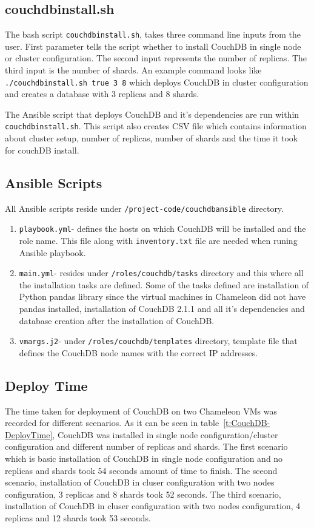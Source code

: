 \subsection{couchdbinstall.sh}

The bash script \verb|couchdbinstall.sh|, takes three command line inputs
from the user. First parameter tells the script whether to install
CouchDB in single node or cluster configuration. The second input
represents the
number of replicas. The third input is the number of shards. An
example command looks like \verb|./couchdbinstall.sh true 3 8| which
deploys CouchDB in cluster configuration and creates a database with 3
replicas and 8 shards.

The Ansible script that deploys CouchDB and it's dependencies are run
within \verb|couchdbinstall.sh|. This script also creates CSV file which
contains information about cluster setup, number of replicas, number
of shards and the time it took for couchDB install.

\subsection{Ansible Scripts}
All Ansible scripts reside under \verb|/project-code/couchdbansible|
directory. 
\begin{enumerate}
  \item \verb|playbook.yml|- defines the hosts on which CouchDB will be
    installed and the role name. This file along with \verb|inventory.txt|
    file are needed when runing Ansible playbook.

  \item \verb|main.yml|- resides under \verb|/roles/couchdb/tasks|
    directory and this where all the installation tasks are
    defined. Some of the tasks defined are installation of Python
    pandas library since the virtual machines in Chameleon did not have pandas
    installed, installation of CouchDB 2.1.1 and all it's dependencies
    and database creation after the installation of CouchDB.

  \item \verb|vmargs.j2|- under \verb|/roles/couchdb/templates| directory, template
    file that defines the CouchDB node names with the correct IP addresses.
\end{enumerate}

\subsection{Deploy Time}
The time taken for deployment of CouchDB on two Chameleon VMs was recorded for different
scenarios. As it can be seen in table~\ref{t:CouchDB-DeployTime},
CouchDB was installed in single node configuration/cluster configuration and different
number of replicas and shards. The first scenario which is basic installation of CouchDB
in single node configuration and no replicas and shards took 54 seconds
amount of time to finish. The sceond scenario, installation of CouchDB
in cluser configuration with two nodes configuration, 3 replicas and
8 shards took 52 seconds. The third scenario, installation of CouchDB
in cluser configuration with two nodes configuration, 4 replicas and
12 shards took 53 seconds. 

